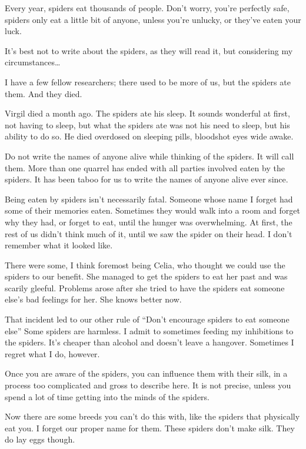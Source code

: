 \noindent Every year, spiders eat thousands of people. Don’t worry, you’re perfectly safe, spiders only eat a little bit of anyone, unless you’re unlucky, or they’ve eaten your luck. 

It’s best not to write about the spiders, as they will read it, but considering my circumstances… 

I have a few fellow researchers; there used to be more of us, but the spiders ate them. And they died.  

Virgil died a month ago. The spiders ate his sleep. It sounds wonderful at first, not having to sleep, but what the spiders ate was not his need to sleep, but his ability to do so. He died overdosed on sleeping pills, bloodshot eyes wide awake.  

Do not write the names of anyone alive while thinking of the spiders. It will call them. More than one quarrel has ended with all parties involved eaten by the spiders. It has been taboo for us to write the names of anyone alive ever since. 

Being eaten by spiders isn’t necessarily fatal. Someone whose name I forget had some of their memories eaten. Sometimes they would walk into a room and forget why they had, or forget to eat, until the hunger was overwhelming. At first, the rest of us didn’t think much of it, until we saw the spider on their head. I don’t remember what it looked like. 

There were some, I think foremost being Celia, who thought we could use the spiders to our benefit. She managed to get the spiders to eat her past and was scarily gleeful. Problems arose after she tried to have the spiders eat someone else’s bad feelings for her. She knows better now.  

That incident led to our other rule of “Don’t encourage spiders to eat someone else” Some spiders are harmless. I admit to sometimes feeding my inhibitions to the spiders. It’s cheaper than alcohol and doesn’t leave a hangover. Sometimes I regret what I do, however. 

Once you are aware of the spiders, you can influence them with their silk, in a process too complicated and gross to describe here. It is not precise, unless you spend a lot of time getting into the minds of the spiders. 

Now there are some breeds you can’t do this with, like the spiders that physically eat you. I forget our proper name for them. These spiders don’t make silk. They do lay eggs though.  

